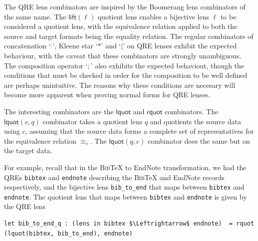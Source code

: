 \documentclass[acmsmall,review,anonymous]{acmart}\settopmatter{printfolios=true,printccs=false,printacmref=false}
\newcommand{\kw}[1]{\ensuremath{\mathsf{#1}}}
\newcommand{\bibtex}{\textsc{Bib}\TeX{}}
\newcommand{\eqrel}[1]{\ensuremath{\equiv_{#1}}}
\newcommand{\cd}[1]{\lstinline[backgroundcolor=\color{white}]$#1$}
\begin{document}
The QRE lens combinators are inspired by the Boomerang lens combinators of the
same name. The $\kw{lift}(\ell)$ quotient lens enables a bijective lens
$\ell$ to be considered a quotient lens, with the equivalence relation applied
to both the source and target formats being the equality relation. The
regular combinators of concatenation `$\cdot$', Kleene star `$*$' and
`$|$' on QRE lenses exhibit the expected behaviour, with the caveat that these
combinators are strongly unambiguous. The composition operator `$;$' also
exhibits the expected behaviout, though the conditions that must be checked in
order for the composition to be well defined are perhaps unintuitive. The
reasons why these conditions are necesary will become more apparent when
proving normal forms for QRE lenses.

The interesting combinators are the $\kw{lquot}$ and $\kw{rquot}$
combinators. The $\kw{lquot}(c, q)$ combinator takes a quotient lens $q$ and
quotients the source data using $c$, assuming that the source data forms a
complete set of representatives for the equivalence relation $\eqrel{c}$. The
$\kw{lquot}(q, c)$ combinator does the same but on the target data.

For example, recall that in the \bibtex{} to EndNote transformation, we had the
QREs \cd{bibtex} and \cd{endnote} describing the \bibtex{} and EndNote records
respectively, and the bijective lens \cd{bib_to_end} that maps between
\cd{bibtex} and \cd{endnote}. The quotient lens that maps between
\cd{bibtex} and \cd{endnote} is given by the QRE lens

\begin{lstlisting}
let bib_to_end_q : (lens in bibtex $\Leftrightarrow$ endnote)  = rquot (lquot(bibtex, bib_to_end), endnote)
\end{lstlisting}

\end{document}
